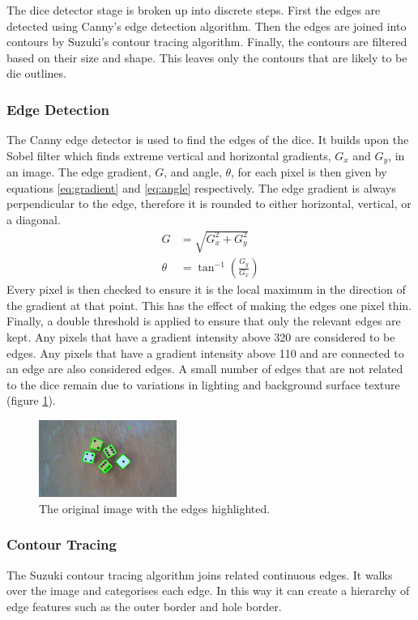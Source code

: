 \documentclass[conference]{IEEEtran}
\begin{document}
The dice detector stage is broken up into discrete steps.
First the edges are detected using Canny's edge detection algorithm.
Then the edges are joined into contours by Suzuki's contour tracing algorithm.
Finally, the contours are filtered based on their size and shape.
This leaves only the contours that are likely to be die outlines.

\subsubsection{Edge Detection}
The Canny edge detector \cite{Canny1986} is used to find the edges of the dice.
It builds upon the Sobel filter \cite{Sobel2014} which finds extreme vertical and horizontal gradients, $G_x$ and $G_y$, in an image.
The edge gradient, $G$, and angle, $\theta$, for each pixel is then given by equations \ref{eq:gradient} and \ref{eq:angle} respectively.
The edge gradient is always perpendicular to the edge, therefore it is rounded to either horizontal, vertical, or a diagonal.
\begin{align}
	G &= \sqrt{G_x^2 + G_y^2} \label{eq:gradient} \\[1em]
	\theta &= \tan^{-1}\left(\frac{G_y}{G_x}\right) \label{eq:angle}
\end{align}
Every pixel is then checked to ensure it is the local maximum in the direction of the gradient at that point.
This has the effect of making the edges one pixel thin.
Finally, a double threshold is applied to ensure that only the relevant edges are kept.
Any pixels that have a gradient intensity above 320 are considered to be edges.
Any pixels that have a gradient intensity above 110 and are connected to an edge are also considered edges.
A small number of edges that are not related to the dice remain due to variations in lighting and background surface texture (figure \ref{fig:canny}).
\begin{figure}
	\centering
	\includegraphics[width=0.4\textwidth]{canny}
	\caption{The original image with the edges highlighted.}
	\label{fig:canny}
\end{figure}

\subsubsection{Contour Tracing}
The Suzuki contour tracing algorithm \cite{Suzuki1985} joins related continuous edges.
It walks over the image and categorises each edge. 
In this way it can create a hierarchy of edge features such as the outer border and hole border.
\end{document}
